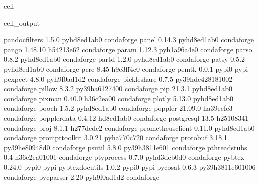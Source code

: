 \documentclass[letterpaper,table,10pt,english]{jupyterBook}
\begin{document}
\begin{sphinxuseclass}{cell}
\begin{sphinxVerbatimOutput}
\begin{sphinxuseclass}{cell_output}
\begin{sphinxVerbatim}[commandchars=\\\{\}]
pandocfilters             1.5.0              pyhd8ed1ab\PYGZus{}0    conda\PYGZhy{}forge
panel                     0.14.3             pyhd8ed1ab\PYGZus{}0    conda\PYGZhy{}forge
pango                     1.48.10              h54213e6\PYGZus{}2    conda\PYGZhy{}forge
param                     1.12.3             pyh1a96a4e\PYGZus{}0    conda\PYGZhy{}forge
parso                     0.8.2              pyhd8ed1ab\PYGZus{}0    conda\PYGZhy{}forge
partd                     1.2.0              pyhd8ed1ab\PYGZus{}0    conda\PYGZhy{}forge
patsy                     0.5.2              pyhd8ed1ab\PYGZus{}0    conda\PYGZhy{}forge
pcre                      8.45                 h9c3ff4c\PYGZus{}0    conda\PYGZhy{}forge
pemtk                     0.0.1                    pypi\PYGZus{}0    pypi
pexpect                   4.8.0              pyh9f0ad1d\PYGZus{}2    conda\PYGZhy{}forge
pickleshare               0.7.5           py39hde42818\PYGZus{}1002    conda\PYGZhy{}forge
pillow                    8.3.2            py39ha612740\PYGZus{}0    conda\PYGZhy{}forge
pip                       21.3.1             pyhd8ed1ab\PYGZus{}0    conda\PYGZhy{}forge
pixman                    0.40.0               h36c2ea0\PYGZus{}0    conda\PYGZhy{}forge
plotly                    5.13.0             pyhd8ed1ab\PYGZus{}0    conda\PYGZhy{}forge
pooch                     1.5.2              pyhd8ed1ab\PYGZus{}0    conda\PYGZhy{}forge
poppler                   21.09.0              ha39eefc\PYGZus{}3    conda\PYGZhy{}forge
poppler\PYGZhy{}data              0.4.12               hd8ed1ab\PYGZus{}0    conda\PYGZhy{}forge
postgresql                13.5                 h2510834\PYGZus{}1    conda\PYGZhy{}forge
proj                      8.1.1                h277dcde\PYGZus{}2    conda\PYGZhy{}forge
prometheus\PYGZus{}client         0.11.0             pyhd8ed1ab\PYGZus{}0    conda\PYGZhy{}forge
prompt\PYGZhy{}toolkit            3.0.21             pyha770c72\PYGZus{}0    conda\PYGZhy{}forge
protobuf                  3.18.1           py39he80948d\PYGZus{}0    conda\PYGZhy{}forge
psutil                    5.8.0            py39h3811e60\PYGZus{}1    conda\PYGZhy{}forge
pthread\PYGZhy{}stubs             0.4               h36c2ea0\PYGZus{}1001    conda\PYGZhy{}forge
ptyprocess                0.7.0              pyhd3deb0d\PYGZus{}0    conda\PYGZhy{}forge
pybtex                    0.24.0                   pypi\PYGZus{}0    pypi
pybtex\PYGZhy{}docutils           1.0.2                    pypi\PYGZus{}0    pypi
pycosat                   0.6.3           py39h3811e60\PYGZus{}1006    conda\PYGZhy{}forge
pycparser                 2.20               pyh9f0ad1d\PYGZus{}2    conda\PYGZhy{}forge

\end{sphinxVerbatim}
\end{sphinxuseclass}
\end{sphinxVerbatimOutput}
\end{sphinxuseclass}
\end{document}

